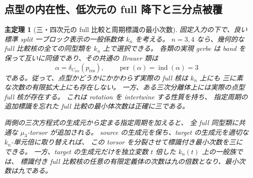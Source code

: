 \documentclass[11pt,a4paper]{ltjsarticle}
\numberwithin{equation}{section}
\newtheorem{maintheorem}{主定理}
\begin{document}
\subsection{点型の内在性、低次元の full 降下と三分点被覆}
\begin{maintheorem}[三・四次元の full 比較と周期標識の最小次数]
\label{main:nfm-low-dimensional-full-descent}
固定入力の下で、良い標準 split 一ブロック表示の一般係数体 $k_n$ を考える。
$n=3,4$ なら、幾何的な full 比較核の全ての同型類を $k_n$ 上で選択できる。
各類の実現 gerbe は band を保って互いに同値であり、その共通の Brauer 類は
\[
 \alpha=\delta_{C_{\mathrm{res}}}(p_{\mathrm{res}}),
 \qquad\operatorname{per}(\alpha)=\operatorname{ind}(\alpha)=3
\]
である。従って、点型かどうかにかかわらず実際の full 核は $k_n$ 上にも
三に素な次数の有限拡大上にも存在しない。
一方、ある三次分離体上には実際の点型 full 核が存在する。
これは rotation を intertwine する性質を持ち、
指定周期の追加標識を忘れた full 比較の最小体次数は正確に三である。

両側の三次方程式の生成元から定まる指定周期を加えると、
全 full 同型類に共通な $\mu_3$-torsor が追加される。
source の生成元を保ち、target の生成元を適切な $k_n$-単元倍に取り替えれば、
この torsor を分裂させて標識付き最小次数を三にできる。
一方、target の生成元だけを独立変数 $t$ 倍した $k_n(t)$ 上の一般族では、
標識付き full 比較核の任意の有限定義体の次数は九の倍数となり、最小次数は九である。
\end{maintheorem}
\end{document}
